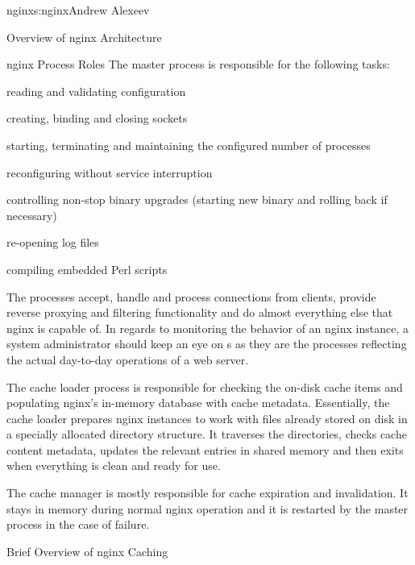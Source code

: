 \begin{aosachapter}{nginx}{s:nginx}{Andrew Alexeev}
\begin{aosasect1}{Overview of nginx Architecture}
\begin{aosasect2}{nginx Process Roles}
The master process is responsible for the following tasks:

\begin{aosaitemize}

\item reading and validating configuration

\item creating, binding and closing sockets

\item starting, terminating and maintaining the configured number of
   processes

\item reconfiguring without service interruption

\item controlling non-stop binary upgrades (starting new binary and
rolling back if necessary)

\item re-opening log files

\item compiling embedded Perl scripts

\end{aosaitemize}

The  processes accept, handle and process connections
from clients, provide reverse proxying and filtering functionality and
do almost everything else that nginx is capable of. In regards to
monitoring the behavior of an nginx instance, a system administrator
should keep an eye on s as they are the processes
reflecting the actual day-to-day operations of a web server.

The cache loader process is responsible for checking the on-disk cache
items and populating nginx's in-memory database with cache
metadata. Essentially, the cache loader prepares nginx instances to
work with files already stored on disk in a specially allocated
directory structure. It traverses the directories, checks cache
content metadata, updates the relevant entries in shared memory and
then exits when everything is clean and ready for use.

The cache manager is mostly responsible for cache expiration and
invalidation. It stays in memory during normal nginx operation and it
is restarted by the master process in the case of failure.

\end{aosasect2}

\begin{aosasect2}{Brief Overview of nginx Caching}


\end{aosasect2}
\end{aosasect1}
\end{aosachapter}
